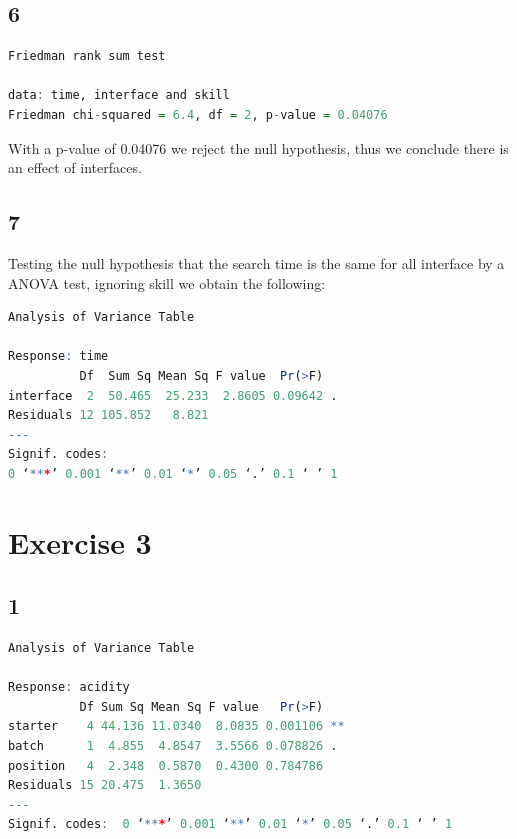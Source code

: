 \documentclass{article}
\begin{document}
    \subsection*{6}
	\begin{lstlisting}[language=R]
Friedman rank sum test

data: time, interface and skill
Friedman chi-squared = 6.4, df = 2, p-value = 0.04076
	\end{lstlisting}
	With a p-value of 0.04076 we reject the null hypothesis, thus we conclude there is an effect of interfaces.
    \subsection*{7}
    Testing the null hypothesis that the search time is the same for all interface by a ANOVA test, ignoring skill we obtain the following:
    \begin{lstlisting}[language=R]
    Analysis of Variance Table

Response: time
          Df  Sum Sq Mean Sq F value  Pr(>F)  
interface  2  50.465  25.233  2.8605 0.09642 .
Residuals 12 105.852   8.821                  
---
Signif. codes:  
0 ‘***’ 0.001 ‘**’ 0.01 ‘*’ 0.05 ‘.’ 0.1 ‘ ’ 1
	\end{lstlisting}
	
  \section*{Exercise 3}
    \subsection*{1}
      \begin{lstlisting}[language=R]
Analysis of Variance Table

Response: acidity
          Df Sum Sq Mean Sq F value   Pr(>F)   
starter    4 44.136 11.0340  8.0835 0.001106 **
batch      1  4.855  4.8547  3.5566 0.078826 . 
position   4  2.348  0.5870  0.4300 0.784786   
Residuals 15 20.475  1.3650                    
---
Signif. codes:  0 ‘***’ 0.001 ‘**’ 0.01 ‘*’ 0.05 ‘.’ 0.1 ‘ ’ 1
      \end{lstlisting}
    
\end{document}
